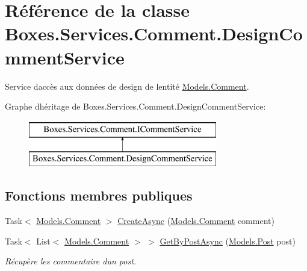 \hypertarget{class_boxes_1_1_services_1_1_comment_1_1_design_comment_service}{}\section{Référence de la classe Boxes.\+Services.\+Comment.\+Design\+Comment\+Service}
\label{class_boxes_1_1_services_1_1_comment_1_1_design_comment_service}


Service d\textquotesingle{}accès aux données de design de l\textquotesingle{}entité \hyperlink{class_boxes_1_1_models_1_1_comment}{Models.\+Comment}.  


Graphe d\textquotesingle{}héritage de Boxes.\+Services.\+Comment.\+Design\+Comment\+Service\+:\begin{figure}[H]
\begin{center}
\leavevmode
\includegraphics[height=2.000000cm]{class_boxes_1_1_services_1_1_comment_1_1_design_comment_service}
\end{center}
\end{figure}
\subsection*{Fonctions membres publiques}
\begin{DoxyCompactItemize}
\item 
Task$<$ \hyperlink{class_boxes_1_1_models_1_1_comment}{Models.\+Comment} $>$ \hyperlink{class_boxes_1_1_services_1_1_comment_1_1_design_comment_service_aac0a94144f815e0af97a289ba92c7a41}{Create\+Async} (\hyperlink{class_boxes_1_1_models_1_1_comment}{Models.\+Comment} comment)
\item 
Task$<$ List$<$ \hyperlink{class_boxes_1_1_models_1_1_comment}{Models.\+Comment} $>$ $>$ \hyperlink{class_boxes_1_1_services_1_1_comment_1_1_design_comment_service_a1bf5da1e81436f15c184721ee504d630}{Get\+By\+Post\+Async} (\hyperlink{class_boxes_1_1_models_1_1_post}{Models.\+Post} post)
\begin{DoxyCompactList}\small\item\em Récupère les commentaire d\textquotesingle{}un post.  \end{DoxyCompactList}\end{DoxyCompactItemize}


